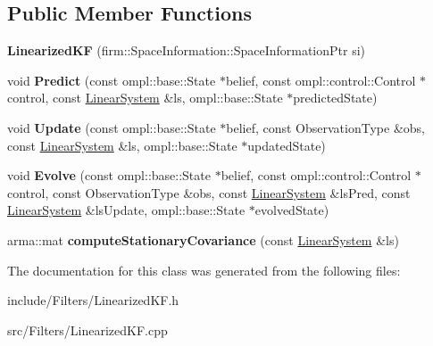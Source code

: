 \subsection*{\-Public \-Member \-Functions}
\begin{DoxyCompactItemize}
\item 
\hypertarget{class_linearized_k_f_af38864b2bbb3759c48011f152541ac93}{{\bfseries \-Linearized\-K\-F} (firm\-::\-Space\-Information\-::\-Space\-Information\-Ptr si)}\label{class_linearized_k_f_af38864b2bbb3759c48011f152541ac93}

\item 
\hypertarget{class_linearized_k_f_a62bda6a7234592bad9e227d45788cf51}{void {\bfseries \-Predict} (const ompl\-::base\-::\-State $\ast$belief, const ompl\-::control\-::\-Control $\ast$control, const \hyperlink{class_linear_system}{\-Linear\-System} \&ls, ompl\-::base\-::\-State $\ast$predicted\-State)}\label{class_linearized_k_f_a62bda6a7234592bad9e227d45788cf51}

\item 
\hypertarget{class_linearized_k_f_abb67e01d9e14a67de60aaa6cdde56552}{void {\bfseries \-Update} (const ompl\-::base\-::\-State $\ast$belief, const \-Observation\-Type \&obs, const \hyperlink{class_linear_system}{\-Linear\-System} \&ls, ompl\-::base\-::\-State $\ast$updated\-State)}\label{class_linearized_k_f_abb67e01d9e14a67de60aaa6cdde56552}

\item 
\hypertarget{class_linearized_k_f_a9de5546e208e7c49ce443c94625cbebc}{void {\bfseries \-Evolve} (const ompl\-::base\-::\-State $\ast$belief, const ompl\-::control\-::\-Control $\ast$control, const \-Observation\-Type \&obs, const \hyperlink{class_linear_system}{\-Linear\-System} \&ls\-Pred, const \hyperlink{class_linear_system}{\-Linear\-System} \&ls\-Update, ompl\-::base\-::\-State $\ast$evolved\-State)}\label{class_linearized_k_f_a9de5546e208e7c49ce443c94625cbebc}

\item 
\hypertarget{class_linearized_k_f_addb9369d36e6d9fcb49668f8ca19ad97}{arma\-::mat {\bfseries compute\-Stationary\-Covariance} (const \hyperlink{class_linear_system}{\-Linear\-System} \&ls)}\label{class_linearized_k_f_addb9369d36e6d9fcb49668f8ca19ad97}

\end{DoxyCompactItemize}


\-The documentation for this class was generated from the following files\-:\begin{DoxyCompactItemize}
\item 
include/\-Filters/\-Linearized\-K\-F.\-h\item 
src/\-Filters/\-Linearized\-K\-F.\-cpp\end{DoxyCompactItemize}
